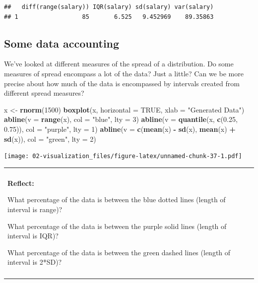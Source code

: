 \documentclass[
]{book}
\newenvironment{Shaded}{\begin{snugshade}}{\end{snugshade}}
\newcommand{\DataTypeTok}[1]{\textcolor[rgb]{0.13,0.29,0.53}{#1}}
\newcommand{\DecValTok}[1]{\textcolor[rgb]{0.00,0.00,0.81}{#1}}
\newcommand{\FloatTok}[1]{\textcolor[rgb]{0.00,0.00,0.81}{#1}}
\newcommand{\KeywordTok}[1]{\textcolor[rgb]{0.13,0.29,0.53}{\textbf{#1}}}
\newcommand{\NormalTok}[1]{#1}
\newcommand{\OperatorTok}[1]{\textcolor[rgb]{0.81,0.36,0.00}{\textbf{#1}}}
\newcommand{\OtherTok}[1]{\textcolor[rgb]{0.56,0.35,0.01}{#1}}
\newcommand{\StringTok}[1]{\textcolor[rgb]{0.31,0.60,0.02}{#1}}
\newenvironment{reflect}
{
    \begin{center}
    
    \begin{tabular}{|p{0.8\textwidth}|}
    \rowcolor{LightBlue}
    \hline\\
    \rowcolor{LightBlue}
    \textbf{Reflect:}
}
{
    \\\rowcolor{LightBlue}
    \\\hline
    \end{tabular} 
    \end{center}
}
\begin{document}
\begin{verbatim}
##   diff(range(salary)) IQR(salary) sd(salary) var(salary)
## 1                  85       6.525   9.452969    89.35863
\end{verbatim}

\hypertarget{intro-zscore}{%
\subsection{Some data accounting}\label{intro-zscore}}

We've looked at different measures of the spread of a distribution. Do some measures of spread encompass a lot of the data? Just a little? Can we be more precise about how much of the data is encompassed by intervals created from different spread measures?

\begin{Shaded}
\begin{Highlighting}[]
\NormalTok{x <-}\StringTok{ }\KeywordTok{rnorm}\NormalTok{(}\DecValTok{1500}\NormalTok{)}
\KeywordTok{boxplot}\NormalTok{(x, }\DataTypeTok{horizontal =} \OtherTok{TRUE}\NormalTok{, }\DataTypeTok{xlab =} \StringTok{"Generated Data"}\NormalTok{)}
\KeywordTok{abline}\NormalTok{(}\DataTypeTok{v =} \KeywordTok{range}\NormalTok{(x), }\DataTypeTok{col =} \StringTok{"blue"}\NormalTok{, }\DataTypeTok{lty =} \DecValTok{3}\NormalTok{)}
\KeywordTok{abline}\NormalTok{(}\DataTypeTok{v =} \KeywordTok{quantile}\NormalTok{(x, }\KeywordTok{c}\NormalTok{(}\FloatTok{0.25}\NormalTok{, }\FloatTok{0.75}\NormalTok{)), }\DataTypeTok{col =} \StringTok{"purple"}\NormalTok{, }\DataTypeTok{lty =} \DecValTok{1}\NormalTok{)}
\KeywordTok{abline}\NormalTok{(}\DataTypeTok{v =} \KeywordTok{c}\NormalTok{(}\KeywordTok{mean}\NormalTok{(x) }\OperatorTok{-}\StringTok{ }\KeywordTok{sd}\NormalTok{(x), }\KeywordTok{mean}\NormalTok{(x) }\OperatorTok{+}\StringTok{ }\KeywordTok{sd}\NormalTok{(x)), }\DataTypeTok{col =} \StringTok{"green"}\NormalTok{, }\DataTypeTok{lty =} \DecValTok{2}\NormalTok{)}
\end{Highlighting}
\end{Shaded}

\texttt{[image: 02-visualization\_files/figure-latex/unnamed-chunk-37-1.pdf]}

\begin{reflect}
What percentage of the data is between the blue dotted lines (length of
interval is range)?

What percentage of the data is between the purple solid lines (length of
interval is IQR)?

What percentage of the data is between the green dashed lines (length of
interval is 2*SD)?
\end{reflect}
\end{document}
